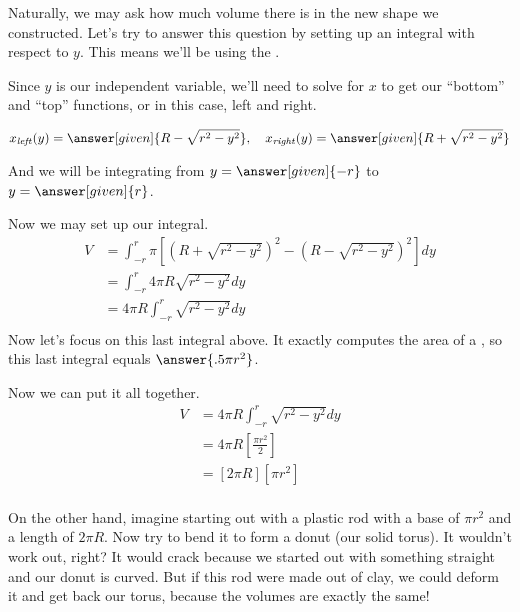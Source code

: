 \documentclass{ximera}
\begin{document}
\begin{exercise}
	Naturally, we may ask how much volume there is in the new shape we constructed. Let's try to answer this question by setting up an integral with respect to $y$. This means we'll be using the  .
	
	Since $y$ is our independent variable, we'll need to solve for $x$ to get our ``bottom'' and ``top'' functions, or in this case, left and right.
	
	$$x_{\mathit{left}}(y) = \answer[given]{R-\sqrt{r^2-y^2}}, \quad  x_{\mathit{right}}(y) = \answer[given]{R+\sqrt{r^2-y^2}}$$
	
	And we will be integrating from $y=\answer[given]{-r}$ to $y=\answer[given]{r}$.
	
	\begin{exercise}
		Now we may set up our integral.
		\begin{align*}
			V  &= \int_{-r}^{r} \pi \left[ \left(R+\sqrt{r^2-y^2} \right)^{2}-\left(R-\sqrt{r^2-y^2} \right)^{2} \right] dy \\
			&= \int_{-r}^{r} 4 \pi R \sqrt{r^2-y^2} dy \\
			&= 4 \pi R \int_{-r}^{r}  \sqrt{r^2-y^2} dy \\
		\end{align*}
		Now let's focus on this last integral above. It exactly computes the area of a , so this last integral equals $\answer{.5 \pi r^2}$.
		\begin{exercise}
			Now we can put it all together.
			\begin{align*}
				V &= 4 \pi R \int_{-r}^{r}  \sqrt{r^2-y^2} dy \\
				&= 4 \pi R \left[ \frac{\pi r^2}{2} \right] \\
				&= \left[ 2 \pi R \right] \left[ \pi r^2 \right] \\
			\end{align*}
			
			On the other hand, imagine starting out with a plastic rod with a base of $\pi r^2$ and a length of $2\pi R$. Now try to bend it to form a donut (our solid torus). It wouldn't work out, right? It would crack because we started out with something straight and our donut is curved. But if this rod were made out of clay, we could deform it and get back our torus, because the volumes are exactly the same!
			

\end{exercise}
\end{exercise}
\end{exercise}
\end{document}
